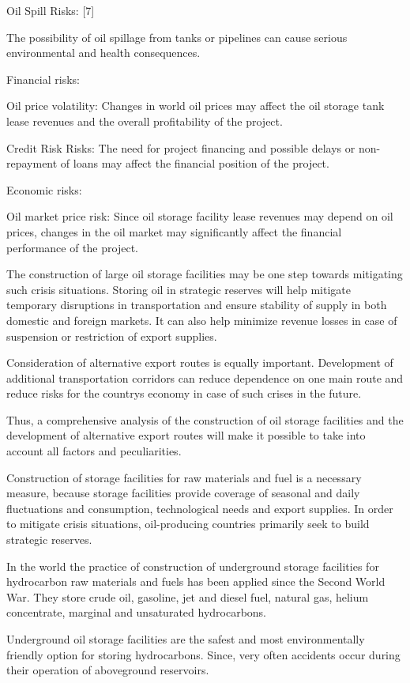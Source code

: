 \begin{multicols}{2}
Oil Spill Risks: {[}7{]}

The possibility of oil spillage from tanks or pipelines can cause
serious environmental and health consequences.

Financial risks:

Oil price volatility: Changes in world oil prices may affect the oil
storage tank lease revenues and the overall profitability of the
project.

Credit Risk Risks: The need for project financing and possible delays or
non-repayment of loans may affect the financial position of the project.

Economic risks:

Oil market price risk: Since oil storage facility lease revenues may
depend on oil prices, changes in the oil market may significantly affect
the financial performance of the project.

The construction of large oil storage facilities may be one step towards
mitigating such crisis situations. Storing oil in strategic reserves
will help mitigate temporary disruptions in transportation and ensure
stability of supply in both domestic and foreign markets. It can also
help minimize revenue losses in case of suspension or restriction of
export supplies.

Consideration of alternative export routes is equally important.
Development of additional transportation corridors can reduce dependence
on one main route and reduce risks for the country\textquotesingle s
economy in case of such crises in the future.

Thus, a comprehensive analysis of the construction of oil storage
facilities and the development of alternative export routes will make it
possible to take into account all factors and peculiarities.

Construction of storage facilities for raw materials and fuel is a
necessary measure, because storage facilities provide coverage of
seasonal and daily fluctuations and consumption, technological needs and
export supplies. In order to mitigate crisis situations, oil-producing
countries primarily seek to build strategic reserves.

In the world the practice of construction of underground storage
facilities for hydrocarbon raw materials and fuels has been applied
since the Second World War. They store crude oil, gasoline, jet and
diesel fuel, natural gas, helium concentrate, marginal and unsaturated
hydrocarbons.

Underground oil storage facilities are the safest and most
environmentally friendly option for storing hydrocarbons. Since, very
often accidents occur during their operation of aboveground reservoirs.


\end{multicols}
